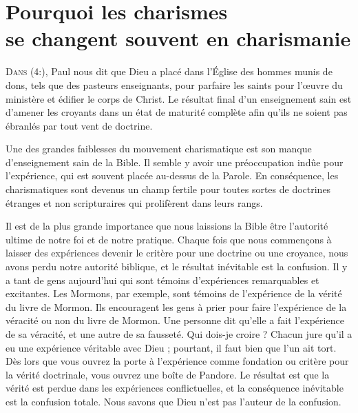 \chapter[Pourquoi les charismes se changent souvent en charismanie]{Pourquoi les charismes\\ se changent souvent en charismanie}
\renewcommand{\chaphead}{{\fontspec{Linux Libertine O} Pourquoi les charismes se changent souvent en charismanie}}

\lettrine{D}{ans (4:),}
 Paul nous dit que Dieu a placé dans l'Église
 des hommes munis de dons, tels que des pasteurs enseignants,
 pour parfaire les saints pour l'œuvre du ministère et édifier le corps
 de Christ. Le résultat final d'un enseignement sain est d'amener
 les croyants dans un état de maturité complète afin qu'ils ne soient
 pas ébranlés par tout vent de doctrine.

\begin{specialpar}{}
Une des grandes faiblesses du mouvement charismatique est son manque
 d'enseignement sain de la Bible. Il semble y avoir une préoccupation
 indûe pour l'expérience, qui est souvent placée au-dessus de la Parole.
 En conséquence, les charismatiques sont devenus un champ fertile
 pour toutes sortes de doctrines étranges et non scripturaires qui prolifèrent
 dans leurs rangs.
\end{specialpar}

Il est de la plus grande importance que nous laissions la Bible être
 l'autorité ultime de notre foi et de notre pratique.
 Chaque fois que nous commençons à laisser des expériences
 devenir le critère pour une doctrine ou une croyance,
 nous avons perdu notre autorité biblique, et le résultat inévitable
 est la confusion. Il y a tant de gens aujourd'hui qui sont témoins
 d'expériences remarquables et excitantes. Les Mormons, par exemple,
 \og sont témoins \fg{} de l'expérience de la vérité du livre de Mormon.
 Ils encouragent les gens à prier pour faire l'expérience de la véracité
 ou non du livre de Mormon. Une personne dit qu'elle a fait l'expérience
 de sa véracité, et une autre de sa fausseté. Qui dois-je croire ?
 Chacun jure qu'il a eu une expérience véritable avec Dieu ;
 pourtant, il faut bien que l'un ait tort.
 Dès lors que vous ouvrez la porte à l'expérience comme fondation
 ou critère pour la vérité doctrinale, vous ouvrez une boîte de Pandore.
 Le résultat est que la vérité est perdue dans les expériences
 conflictuelles, et la conséquence inévitable est la confusion totale.
 Nous savons que Dieu n'est pas l'auteur de la confusion.


